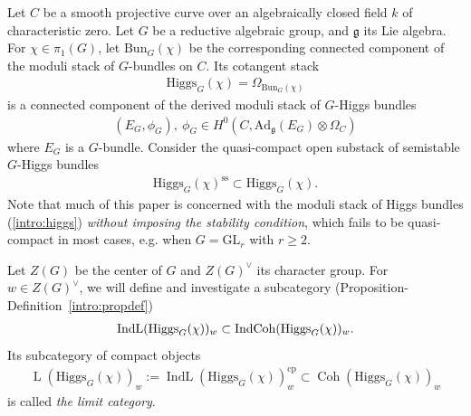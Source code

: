 \documentclass [11pt,oneside,a4paper,mathscr]{amsart}
\theoremstyle{definition}
\renewcommand{\geq}{\geqslant}
\newcommand{\LL}{\operatorname{L}}
\newcommand{\fg}{\mathfrak{g}}
\newcommand{\Coh}{\operatorname{Coh}}
\newcommand{\IndCoh}{\operatorname{IndCoh}}
\newcommand{\IndL}{\operatorname{IndL}}
\newcommand{\Ad}{\mathrm{Ad}}
\newcommand{\Hig}{\mathrm{Higgs}}
\newcommand{\Bun}{\mathrm{Bun}}
\begin{document}
Let $C$ be a smooth projective curve over an algebraically closed field 
$k$ of characteristic zero. Let $G$ be a reductive algebraic group, and 
$\mathfrak{g}$ its Lie algebra. 
For $\chi \in \pi_1(G)$, let $\Bun_G(\chi)$ be the 
corresponding connected component of the moduli stack of $G$-bundles on $C$. 
Its cotangent stack
\begin{align}\label{intro:higgs}
    \Hig_G(\chi)=\Omega_{\Bun_G(\chi)}
\end{align}
is a connected component of the derived moduli stack of $G$-Higgs bundles
\begin{align*}%
(E_G, \phi_G), \ \phi_G \in H^0(C, \Ad_{\fg}(E_G)\otimes \Omega_C)
\end{align*}
where $E_G$ is a $G$-bundle. 
Consider the quasi-compact open substack of semistable $G$-Higgs bundles 
\begin{align*}
    \Hig_G(\chi)^{\mathrm{ss}} \subset \Hig_G(\chi). 
\end{align*}
Note that much of this paper is concerned with the moduli stack of Higgs bundles (\ref{intro:higgs})
\textit{without imposing the stability condition}, which fails to be quasi-compact in most cases, e.g. when $G=\mathrm{GL}_r$ with $r\geq 2$.

Let $Z(G)$ be the center of $G$ and $Z(G)^{\vee}$ its character group. 
For $w\in Z(G)^{\vee}$, we will define and investigate a subcategory (Proposition-Definition~\ref{intro:propdef})
\begin{align}\notag
    \IndL(\Hig_G(\chi))_w \subset \IndCoh(\Hig_G(\chi))_w.
\end{align}
Its subcategory of compact objects 
\begin{align}\label{intro:limit}
\LL(\Hig_G(\chi))_w
:=\IndL(\Hig_G(\chi))_w^{\mathrm{cp}}\subset \Coh(\Hig_G(\chi))_w
\end{align}
is called \textit{the limit category}.
\end{document}
